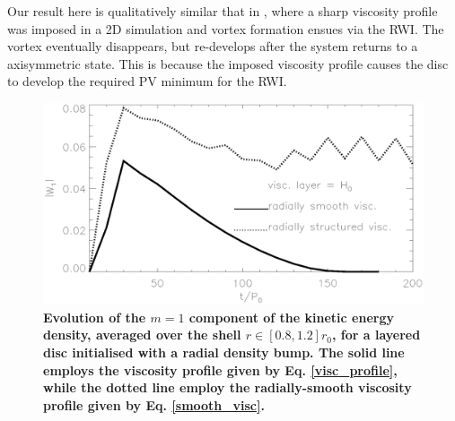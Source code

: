 {  Our result here is qualitatively similar that in \cite{regaly12},
  where a sharp viscosity profile was imposed in a 2D simulation and 
  vortex formation ensues via the RWI. The vortex eventually
  disappears, but re-develops after the system returns to a
  axisymmetric state. This is because the imposed viscosity profile
  causes the disc to develop the required PV minimum for the RWI. 

 \begin{figure}
  \centering
  \includegraphics[width=\linewidth]{figures/pdisk_kerz_cases_appendix1.ps}
  \caption{ {\bf Evolution of the $m=1$ component of the kinetic energy
    density, averaged over the shell $r\in[0.8,1.2]r_0$, for a layered 
    disc initialised with a radial density bump. 
    The solid line employs the viscosity profile given by 
    Eq. \ref{visc_profile}, while the dotted line employ the radially-smooth
    viscosity profile given by Eq. \ref{smooth_visc}.}\label{appen}}
  \end{figure}

}
